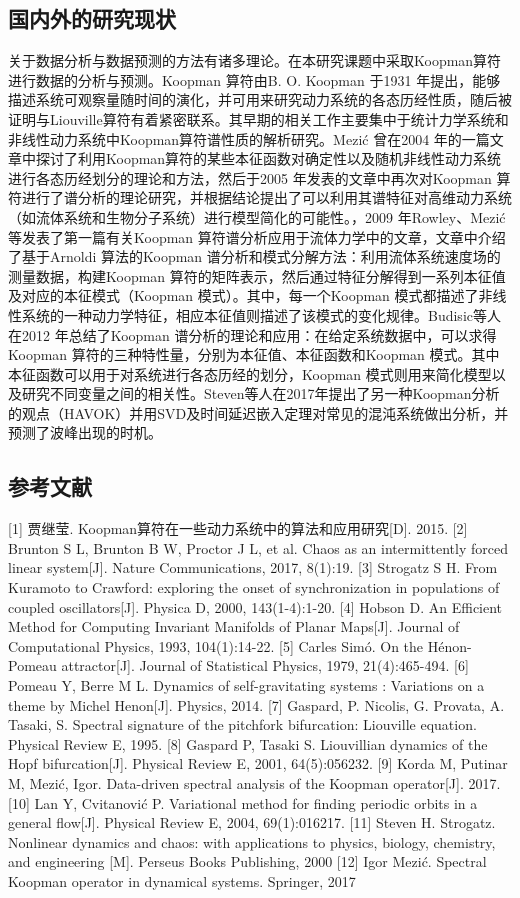\subsection{国内外的研究现状}
关于数据分析与数据预测的方法有诸多理论。在本研究课题中采取Koopman算符进行数据的分析与预测。Koopman 算符由B. O. Koopman 于1931 年提出，能够描述系统可观察量随时间的演化，并可用来研究动力系统的各态历经性质，随后被证明与Liouville算符有着紧密联系。其早期的相关工作主要集中于统计力学系统和非线性动力系统中Koopman算符谱性质的解析研究。Mezić 曾在2004 年的一篇文章中探讨了利用Koopman算符的某些本征函数对确定性以及随机非线性动力系统进行各态历经划分的理论和方法，然后于2005 年发表的文章中再次对Koopman 算符进行了谱分析的理论研究，并根据结论提出了可以利用其谱特征对高维动力系统（如流体系统和生物分子系统）进行模型简化的可能性。，2009 年Rowley、Mezić 等发表了第一篇有关Koopman 算符谱分析应用于流体力学中的文章，文章中介绍了基于Arnoldi 算法的Koopman 谱分析和模式分解方法：利用流体系统速度场的测量数据，构建Koopman 算符的矩阵表示，然后通过特征分解得到一系列本征值及对应的本征模式（Koopman 模式）。其中，每一个Koopman 模式都描述了非线性系统的一种动力学特征，相应本征值则描述了该模式的变化规律。Budisic等人在2012 年总结了Koopman 谱分析的理论和应用：在给定系统数据中，可以求得Koopman 算符的三种特性量，分别为本征值、本征函数和Koopman 模式。其中本征函数可以用于对系统进行各态历经的划分，Koopman 模式则用来简化模型以及研究不同变量之间的相关性。Steven等人在2017年提出了另一种Koopman分析的观点（HAVOK）并用SVD及时间延迟嵌入定理对常见的混沌系统做出分析，并预测了波峰出现的时机。

\subsection{参考文献}
[1] 贾继莹. Koopman算符在一些动力系统中的算法和应用研究[D]. 2015.
[2] Brunton S L, Brunton B W, Proctor J L, et al. Chaos as an intermittently forced linear system[J]. Nature Communications, 2017, 8(1):19.
[3] Strogatz S H. From Kuramoto to Crawford: exploring the onset of synchronization in populations of coupled oscillators[J]. Physica D, 2000, 143(1-4):1-20.
[4] Hobson D. An Efficient Method for Computing Invariant Manifolds of Planar Maps[J]. Journal of Computational Physics, 1993, 104(1):14-22.
[5] Carles Simó. On the Hénon-Pomeau attractor[J]. Journal of Statistical Physics, 1979, 21(4):465-494.
[6] Pomeau Y, Berre M L. Dynamics of self-gravitating systems : Variations on a theme by Michel Henon[J]. Physics, 2014.
[7] Gaspard, P. Nicolis, G. Provata, A. Tasaki, S. Spectral signature of the pitchfork bifurcation: Liouville equation. Physical Review E, 1995.
[8] Gaspard P, Tasaki S. Liouvillian dynamics of the Hopf bifurcation[J]. Physical Review E, 2001, 64(5):056232.
[9] Korda M, Putinar M, Mezić, Igor. Data-driven spectral analysis of the Koopman operator[J]. 2017.
[10] Lan Y, Cvitanović P. Variational method for finding periodic orbits in a general flow[J]. Physical Review E, 2004, 69(1):016217.
[11] Steven H. Strogatz. Nonlinear dynamics and chaos: with applications to physics, biology, chemistry, and engineering [M]. Perseus Books Publishing, 2000
[12] Igor Mezić. Spectral Koopman operator in dynamical systems. Springer, 2017

